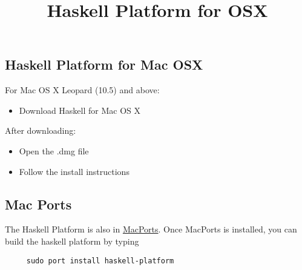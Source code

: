 \documentclass{article}
\title{Haskell Platform for OSX}
\author{}
\begin{document}
\maketitle

\subsection{Haskell Platform for Mac OSX}

For Mac OS X Leopard (10.5) and above:

\begin{itemize}
\item
  Download Haskell for Mac OS X
\end{itemize}
After downloading:

\begin{itemize}
\item
  Open the .dmg file
\item
  Follow the install instructions
\end{itemize}
\subsection{Mac Ports}

The Haskell Platform is also in
\href{http://macports.org}{MacPorts}. Once MacPorts is installed,
you can build the haskell platform by typing

\begin{verbatim}
     sudo port install haskell-platform
\end{verbatim}
\end{document}
